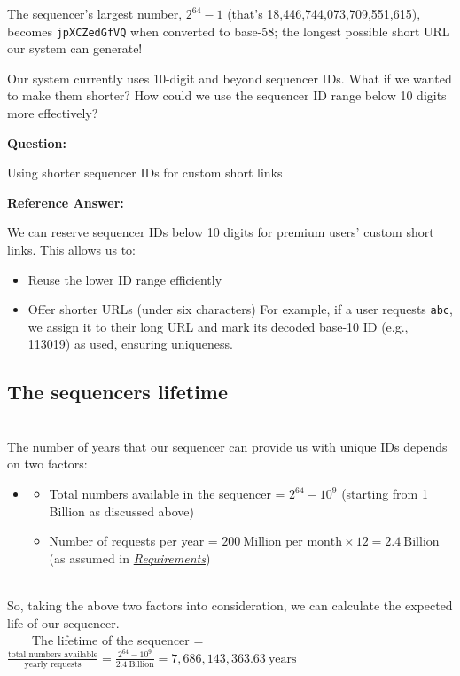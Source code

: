 The sequencer's largest number, \(2^{64} - 1\) (that's 18,446,744,073,709,551,615), becomes \texttt{jpXCZedGfVQ} when converted to base-58; the longest possible short URL our system can generate!

Our system currently uses 10-digit and beyond sequencer IDs. What if we wanted to make them shorter? How could we use the sequencer ID range below 10 digits more effectively?

\textbf{Question:}

Using shorter sequencer IDs for custom short links

\textbf{Reference Answer:}

We can reserve sequencer IDs below 10 digits for premium users' custom short links. This allows us to:

\begin{itemize}
\tightlist
\item
Reuse the lower ID range efficiently
\item
Offer shorter URLs (under six characters) For example, if a user requests \texttt{abc}, we assign it to their long URL and mark its decoded base-10 ID (e.g., 113019) as used, ensuring uniqueness.
\end{itemize}

\subsection{The sequencer\textquotesingle s lifetime}\label{HQlG8ikIk2bhrAbwiw90t}
\\
The number of years that our sequencer can provide us with unique IDs depends on two factors:

\begin{itemize}
\item
\begin{itemize}
\item
\protect{}\label{JCoHbkrnU2sRtn_1tejQS}
Total numbers available in the sequencer = \protect{}\label{katex_inline_h6oymdExhzgX0tGsW6YDE}{{{\(2^{64} - 10^{9}\)}}} (starting from 1 Billion as discussed above)
\item
\protect{}\label{aLrY-2886u0zFibmoZ0ez}
Number of requests per year = \protect{}\label{katex_inline_4aIuB0MVhtz05f7AL5R_K}{{{\(200 \ \text{Million per month} \times 12 = 2.4 \ \text{Billion}\)}}} (as assumed in \href{https://www.educative.io/courses/grokking-the-system-design-interview/requirements-of-tinyurls-design}{\emph{Requirements}})
\end{itemize}
\end{itemize}
\\
So, taking the above two factors into consideration, we can calculate the expected life of our sequencer.
\\
  The lifetime of the sequencer = \protect{}\label{katex_inline_S18E3hhhnM3Edhf687Z6a}{{{\(\frac{\text{total numbers available}}{\text{yearly requests}}= \frac{2^{64} - 10^{9}}{2.4 \ \text{Billion}} = 7,686,143,363.63 \ \text{years}\)}}}

